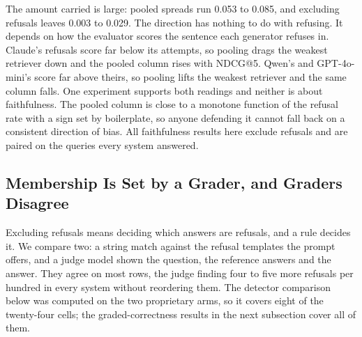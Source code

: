 \documentclass[11pt]{article}
\begin{document}
\begin{table}[t]
\centering
{}
\caption{Pooling refusals into the faithfulness average gives a column that tracks retrieval quality in every generator ($\rho$ = Spearman against NDCG@5 over the four systems) --- in opposite directions. Excluding them collapses the spread and the ordering follows retrieval quality in none of the three.}
\label{tab:4}
\end{table}

The amount carried is large: pooled spreads run 0.053 to 0.085, and excluding refusals leaves 0.003 to 0.029. The direction has nothing to do with refusing. It depends on how the evaluator scores the sentence each generator refuses in. Claude's refusals score far below its attempts, so pooling drags the weakest retriever down and the pooled column rises with NDCG@5. Qwen's and GPT-4o-mini's score far above theirs, so pooling lifts the weakest retriever and the same column falls. One experiment supports both readings and neither is about faithfulness. The pooled column is close to a monotone function of the refusal rate with a sign set by boilerplate, so anyone defending it cannot fall back on a consistent direction of bias. All faithfulness results here exclude refusals and are paired on the queries every system answered.


\subsection{Membership Is Set by a Grader, and Graders Disagree}
\label{sec:graders}

Excluding refusals means deciding which answers are refusals, and a rule decides it. We compare two: a string match against the refusal templates the prompt offers, and a judge model shown the question, the reference answers and the answer. They agree on most rows, the judge finding four to five more refusals per hundred in every system without reordering them. The detector comparison below was computed on the two proprietary arms, so it covers eight of the twenty-four cells; the graded-correctness results in the next subsection cover all of them.
\end{document}
